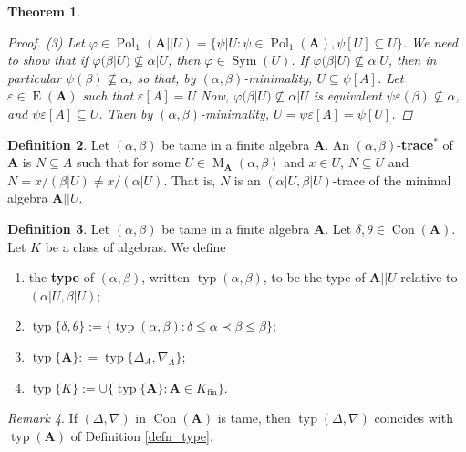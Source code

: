 \documentclass{amsart}
\theoremstyle{plain}
\newtheorem{theorem}{Theorem}[section]
\theoremstyle{definition}
\newtheorem{definition}[theorem]{Definition}
\theoremstyle{remark}
\newtheorem{remark}[theorem]{Remark}
\def\phi{\varphi}
\def\epsilon{\varepsilon}
\DeclareMathOperator{\Con}{Con}
\DeclareMathOperator{\Pol}{Pol}
\DeclareMathOperator{\typ}{typ}
\DeclareMathOperator{\Sym}{Sym}
\DeclareMathOperator{\Id}{E}
\DeclareMathOperator{\M}{M}
\DeclareMathOperator{\fin}{fin}
\begin{document}
\begin{theorem}
\begin{proof}
        (3) Let $\phi \in \Pol_1(\mathbf{A}||U)=\{\psi|U : \psi \in \Pol_1(\mathbf{A}), \psi[U] \subseteq U\}$. 
        We need to show that if $\phi(\beta | U) \nsubseteq \alpha|U$, then $\phi \in \Sym(U)$. 
        If $\phi(\beta | U) \nsubseteq \alpha|U$, then in particular $\psi(\beta) \nsubseteq \alpha$, so that, by $(\alpha,\beta)$-minimality, $U \subseteq \psi[A]$. 
        Let $\epsilon \in \Id(\mathbf{A})$ such that $\epsilon[A]=U$
        Now, $\phi(\beta | U) \nsubseteq \alpha|U$ is equivalent $\psi \epsilon (\beta) \nsubseteq \alpha$, and $\psi \epsilon[A] \subseteq U$. 
        Then by $(\alpha, \beta)$-minimality, $U =\psi \epsilon[A] = \psi[U]$.  
    \end{proof}
\end{theorem}

\begin{definition}
    Let $(\alpha, \beta)$ be tame in a finite algebra $\mathbf{A}$. 
    An $(\alpha, \beta)$-\textbf{trace$^*$} of $\mathbf{A}$ is 
    $N \subseteq A$ such that for some $U \in \M_{\mathbf{A}}(\alpha, \beta)$ and $x \in U$, $N\subseteq U$ and $N=x/(\beta|U) \neq x/(\alpha|U)$. 
    That is, $N$ is an $(\alpha|U, \beta|U)$-trace of the minimal algebra $\mathbf{A}||U$. 
\end{definition}

\begin{definition}
    Let $(\alpha, \beta)$ be tame in a finite algebra $\mathbf{A}$.
    Let $\delta, \theta \in \Con(\mathbf{A})$. 
    Let $K$ be a class of algebras. 
    We define 
    \begin{enumerate}
        \item the \textbf{type} of $(\alpha, \beta)$, written $\typ(\alpha, \beta)$, to be the type of
        $\mathbf{A}||U$ relative to $(\alpha|U, \beta|U)$;
        \item $\typ\{\delta, \theta\} :=\{ \typ(\alpha, \beta) : \delta \le \alpha \prec \beta \le \beta\}$;
        \item $\typ\{\mathbf{A}\}: =\typ\{\Delta_A, \nabla_A\}$; 
        \item $\typ\{K\}:=\cup\{\typ\{\mathbf{A}\} : \mathbf{A} \in K_{\fin}\}$. 
    \end{enumerate}
\end{definition}

\begin{remark}
    If $(\Delta, \nabla)$ in $\Con(\mathbf{A})$ is tame, then $\typ(\Delta, \nabla)$ coincides with $\typ(\mathbf{A})$ of Definition \ref{defn_type}. 
\end{remark}
\end{document}
